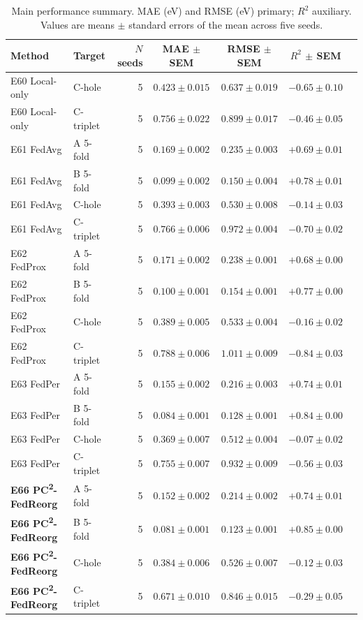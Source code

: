 \documentclass[11pt,a4paper]{article}
\newcommand{\PC}{PC\textsuperscript{2}-FedReorg}
\begin{document}
\begin{table}[t]
\centering
\small
\caption{Main performance summary. MAE (eV) and RMSE (eV) primary; $R^2$ auxiliary. Values are means $\pm$ standard errors of the mean across five seeds.}\label{tab:main-perf}
\begin{tabular}{@{}llrcccc@{}}
\toprule
Method & Target & $N$ seeds & MAE $\pm$ SEM & RMSE $\pm$ SEM & $R^2$ $\pm$ SEM \\
\midrule
E60 Local-only         & C-hole    & 5 & $0.423 \pm 0.015$ & $0.637 \pm 0.019$ & $-0.65 \pm 0.10$ \\
E60 Local-only         & C-triplet & 5 & $0.756 \pm 0.022$ & $0.899 \pm 0.017$ & $-0.46 \pm 0.05$ \\
\addlinespace
E61 FedAvg             & A 5-fold  & 5 & $0.169 \pm 0.002$ & $0.235 \pm 0.003$ & $+0.69 \pm 0.01$ \\
E61 FedAvg             & B 5-fold  & 5 & $0.099 \pm 0.002$ & $0.150 \pm 0.004$ & $+0.78 \pm 0.01$ \\
E61 FedAvg             & C-hole    & 5 & $0.393 \pm 0.003$ & $0.530 \pm 0.008$ & $-0.14 \pm 0.03$ \\
E61 FedAvg             & C-triplet & 5 & $0.766 \pm 0.006$ & $0.972 \pm 0.004$ & $-0.70 \pm 0.02$ \\
\addlinespace
E62 FedProx            & A 5-fold  & 5 & $0.171 \pm 0.002$ & $0.238 \pm 0.001$ & $+0.68 \pm 0.00$ \\
E62 FedProx            & B 5-fold  & 5 & $0.100 \pm 0.001$ & $0.154 \pm 0.001$ & $+0.77 \pm 0.00$ \\
E62 FedProx            & C-hole    & 5 & $0.389 \pm 0.005$ & $0.533 \pm 0.004$ & $-0.16 \pm 0.02$ \\
E62 FedProx            & C-triplet & 5 & $0.788 \pm 0.006$ & $1.011 \pm 0.009$ & $-0.84 \pm 0.03$ \\
\addlinespace
E63 FedPer             & A 5-fold  & 5 & $0.155 \pm 0.002$ & $0.216 \pm 0.003$ & $+0.74 \pm 0.01$ \\
E63 FedPer             & B 5-fold  & 5 & $0.084 \pm 0.001$ & $0.128 \pm 0.001$ & $+0.84 \pm 0.00$ \\
E63 FedPer             & C-hole    & 5 & $0.369 \pm 0.007$ & $0.512 \pm 0.004$ & $-0.07 \pm 0.02$ \\
E63 FedPer             & C-triplet & 5 & $0.755 \pm 0.007$ & $0.932 \pm 0.009$ & $-0.56 \pm 0.03$ \\
\addlinespace
\textbf{E66 \PC{}}     & A 5-fold  & 5 & $\mathbf{0.152 \pm 0.002}$ & $\mathbf{0.214 \pm 0.002}$ & $+0.74 \pm 0.01$ \\
\textbf{E66 \PC{}}     & B 5-fold  & 5 & $\mathbf{0.081 \pm 0.001}$ & $\mathbf{0.123 \pm 0.001}$ & $+0.85 \pm 0.00$ \\
\textbf{E66 \PC{}}     & C-hole    & 5 & $0.384 \pm 0.006$ & $0.526 \pm 0.007$ & $-0.12 \pm 0.03$ \\
\textbf{E66 \PC{}}     & C-triplet & 5 & $\mathbf{0.671 \pm 0.010}$ & $\mathbf{0.846 \pm 0.015}$ & $-0.29 \pm 0.05$ \\
\bottomrule
\end{tabular}
\end{table}
\end{document}
